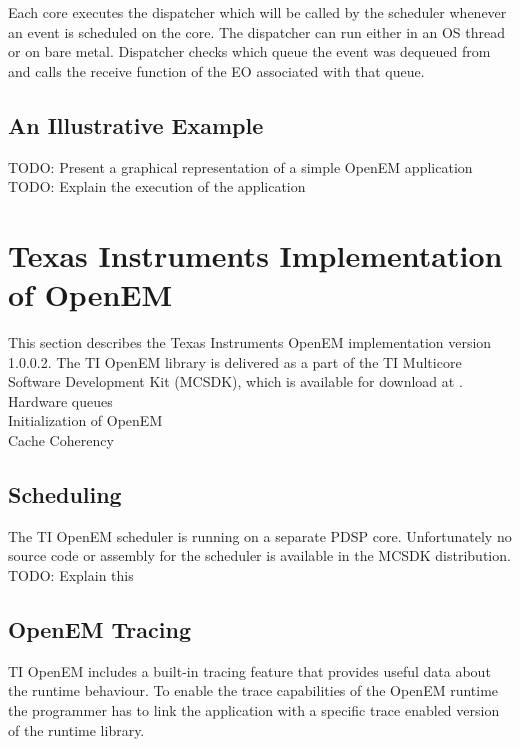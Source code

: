 Each core executes the dispatcher which will be called by the scheduler
whenever an event is scheduled on the core. The dispatcher can run either in an
OS thread or on bare metal. Dispatcher checks which queue the event was
dequeued from and calls the receive function of the EO associated with that
queue. \cite{openemintro}

\subsection{An Illustrative Example}
\label{subsec:example}
TODO: Present a graphical representation of a simple OpenEM application\\
TODO: Explain the execution of the application

\section[Texas Instruments Implementation of OpenEM]{Texas Instruments Implementation \\ of OpenEM}
\label{sec:tiopenem}
This section describes the Texas Instruments OpenEM implementation version
1.0.0.2. The TI OpenEM library is delivered as a part of the TI Multicore
Software Development Kit (MCSDK), which is available for download at
\cite{mcsdkdown}.\\

Hardware queues\\
Initialization of OpenEM\\
Cache Coherency

\subsection{Scheduling}
The TI OpenEM scheduler is running on a separate PDSP core. Unfortunately no
source code or assembly for the scheduler is available in the MCSDK distribution.\\

TODO: Explain this

\subsection{OpenEM Tracing}
TI OpenEM includes a built-in tracing feature that provides useful data about
the runtime behaviour. To enable the trace capabilities of the OpenEM runtime the
programmer has to link the application with a specific trace enabled version of
the runtime library. \cite{openemapi}

